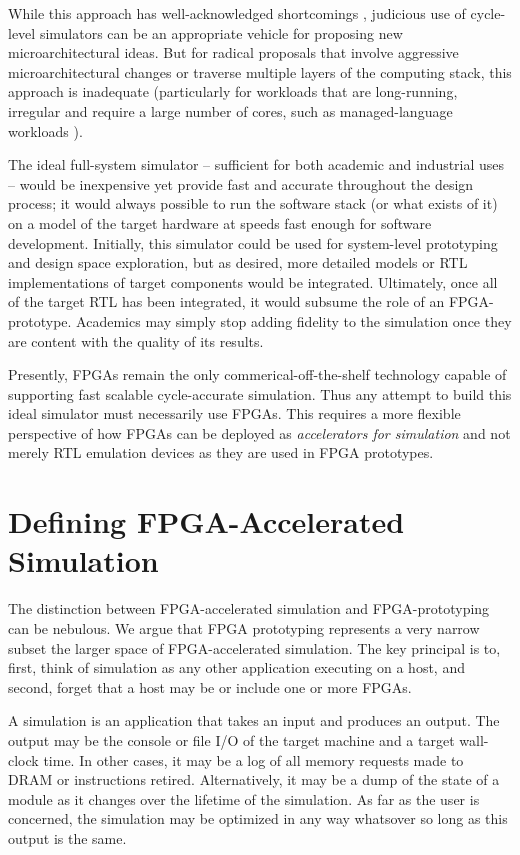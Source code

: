 While this approach has well-acknowledged shortcomings \cite{gem5error},
judicious use of cycle-level simulators can be an appropriate vehicle for
proposing new microarchitectural ideas. But for radical proposals that involve
aggressive microarchitectural changes or traverse multiple layers of the
computing stack, this approach is inadequate (particularly for workloads that
are long-running, irregular and require a large number of cores, such as
managed-language workloads \cite{MicroSimPanel}).

The ideal full-system simulator -- sufficient for both academic and industrial
uses -- would be inexpensive yet provide fast and accurate throughout the
design process; it would always possible to run the software stack (or what
exists of it) on a model of the target hardware at speeds fast enough for
software development. Initially, this simulator could be used for system-level
prototyping and design space exploration, but as desired, more detailed models
or RTL implementations of target components would be integrated. Ultimately,
once all of the target RTL has been integrated, it would subsume the role of an
FPGA-prototype. Academics may simply stop adding fidelity to the simulation
once they are content with the quality of its results.

Presently, FPGAs remain the only commerical-off-the-shelf technology capable of
supporting fast scalable cycle-accurate simulation. Thus any attempt to build
this ideal simulator must necessarily use FPGAs. This requires a more flexible
perspective of how FPGAs can be deployed as \emph{accelerators for simulation}
and not merely RTL emulation devices as they are used in FPGA prototypes.

\section{Defining FPGA-Accelerated Simulation}

The distinction between FPGA-accelerated simulation and FPGA-prototyping can be
nebulous. We argue that FPGA prototyping represents a very narrow subset the
larger space of FPGA-accelerated simulation. The key principal is to, first,
think of simulation as any other application executing on a host, and second,
forget that a host may be or include one or more FPGAs.

A simulation is an application that takes an input and produces an output.  The
output may be the console or file I/O of the target machine and a target
wall-clock time. In other cases, it may be a log of all memory requests made to
DRAM or instructions retired. Alternatively, it may be a dump of the state of a
module as it changes over the lifetime of the simulation.  As far as the user
is concerned, the simulation may be optimized in any way whatsover so long as
this output is the same.

